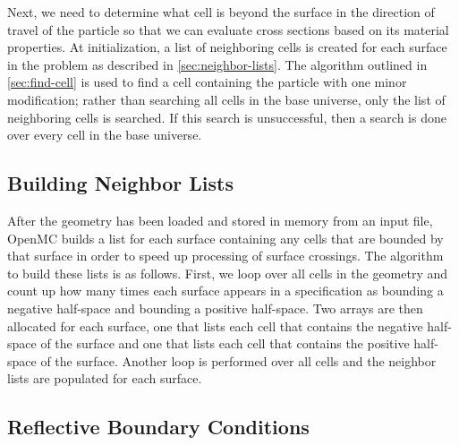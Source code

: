 Next, we need to determine what cell is beyond the surface in the direction of
travel of the particle so that we can evaluate cross sections based on its
material properties. At initialization, a list of neighboring cells is created
for each surface in the problem as described in
\autoref{sec:neighbor-lists}. The algorithm outlined in \autoref{sec:find-cell}
is used to find a cell containing the particle with one minor modification;
rather than searching all cells in the base universe, only the list of
neighboring cells is searched. If this search is unsuccessful, then a search is
done over every cell in the base universe.

\subsection{Building Neighbor Lists}
\label{sec:neighbor-lists}

After the geometry has been loaded and stored in memory from an input file,
OpenMC builds a list for each surface containing any cells that are bounded by
that surface in order to speed up processing of surface crossings. The algorithm
to build these lists is as follows. First, we loop over all cells in the
geometry and count up how many times each surface appears in a specification as
bounding a negative half-space and bounding a positive half-space. Two arrays
are then allocated for each surface, one that lists each cell that contains the
negative half-space of the surface and one that lists each cell that contains
the positive half-space of the surface. Another loop is performed over all cells
and the neighbor lists are populated for each surface.

\subsection{Reflective Boundary Conditions}
\label{sec:reflection}

